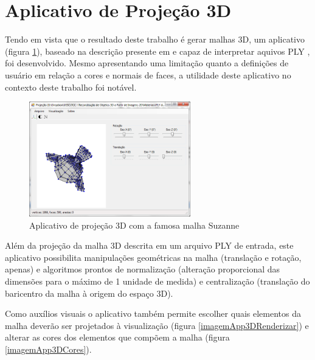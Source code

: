 	\section{Aplicativo de Projeção 3D}
		\label{app3D}
		
		Tendo em vista que o resultado deste trabalho é gerar malhas 3D, um aplicativo (figura \ref{imagemApp3D}), baseado na descrição presente em \cite{compGraphsPrincPrat3ed} e capaz de interpretar aquivos PLY \cite{ply}, foi desenvolvido. Mesmo apresentando uma limitação quanto a definições de usuário em relação a cores e normais de faces, a utilidade deste aplicativo no contexto deste trabalho foi notável.
		
		\begin{figure}[!htb]
			\centering
			\includegraphics[height=5cm]{imagens/printApp3D.png}
			\caption{Aplicativo de projeção 3D com a famosa malha Suzanne}
			\label{imagemApp3D}
		\end{figure}
		
		Além da projeção da malha 3D descrita em um arquivo PLY de entrada, este aplicativo possibilita manipulações geométricas na malha (translação e rotação, apenas) e algoritmos prontos de normalização (alteração proporcional das dimensões para o máximo de 1 unidade de medida) e centralização (translação do baricentro da malha à origem do espaço 3D).
		
		Como auxílios visuais o aplicativo também permite escolher quais elementos da malha deverão ser projetados à visualização (figura \ref{imagemApp3DRenderizar}) e alterar as cores dos elementos que compõem a malha (figura \ref{imagemApp3DCores}).
		

